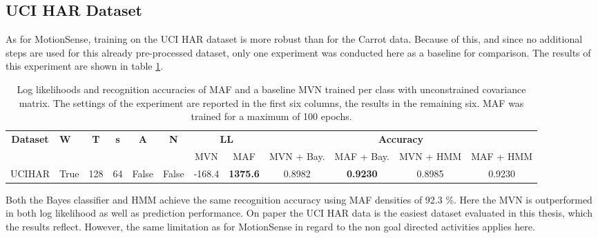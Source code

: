 \documentclass[11pt,titlepage,oneside,openany]{book}
\begin{document}
\subsection{UCI HAR Dataset}
As for MotionSense, training on the UCI HAR dataset is more robust than for the Carrot data. Because of this, and since no additional steps are used for this already pre-processed dataset, only one experiment was conducted here as a baseline for comparison. The results of this experiment are shown in table \ref{tab:uci}.

\begin{table}[H]
	\centering
	\tiny
	\begin{tabular}{c l c c c c c c c c c c}
		\toprule
		\multirow{2}{*}{\bfseries Dataset} & 
		\multirow{2}{*}{\bfseries W} & 
		\multirow{2}{*}{\bfseries T} &
		\multirow{2}{*}{\bfseries s} &
		\multirow{2}{*}{\bfseries A} &
		\multirow{2}{*}{\bfseries N} &
		\multicolumn{2}{c}{\bfseries LL} & 
		\multicolumn{4}{c}{\bfseries Accuracy}\\
		\cmidrule(lr){7-8}
		\cmidrule(lr){9-12}
		& & & & & & MVN & MAF & MVN + Bay. & MAF + Bay. & MVN + HMM & MAF + HMM \\
		\cmidrule(lr){1-12}
		UCIHAR &    True &     128 &      64 &    False &  False & -168.4 & \textbf{1375.6} &   0.8982 &   \textbf{0.9230} &   0.8985 &   0.9230 \\
		\bottomrule
	\end{tabular}
	\caption[Evaluation Results UCI HAR, Long]{\label{tab:uci} Log likelihoods and recognition accuracies of MAF and a baseline MVN trained per class with unconstrained covariance matrix. The settings of the experiment are reported in the first six columns, the results in the remaining six. MAF was trained for a maximum of 100 epochs.}
\end{table}

\noindent Both the Bayes classifier and HMM achieve the same recognition accuracy using MAF densities of 92.3 \%. Here the MVN is outperformed in both log likelihood as well as prediction performance. On paper the UCI HAR data is the easiest dataset evaluated in this thesis, which the results reflect. However, the same limitation as for MotionSense in regard to the non goal directed activities applies here.
\end{document}

